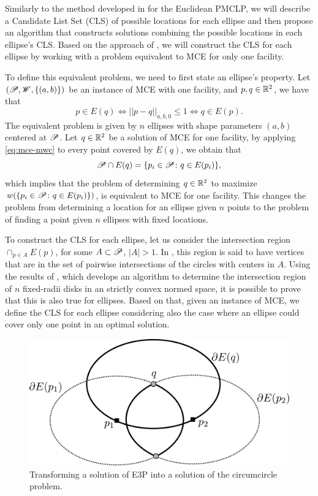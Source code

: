 Similarly to the method developed in \cite{church:1984} for the Euclidean PMCLP, we will describe a Candidate List Set (CLS) of possible locations for each ellipse and then propose an algorithm that constructs solutions combining the possible locations in each ellipse's CLS.
Based on the approach of \cite{chazelle:1986,cabello:2006}, we will construct the CLS for each ellipse by working with a problem equivalent to MCE for only one facility.

To define this equivalent problem, we need to first state an ellipse's property.
Let $(\mathscr{P}, \mathscr{W}, \{(a, b)\})$ be an instance of MCE with one facility, and  $p, q \in \mathbb{R}^2$, we have that
\begin{equation}\label{eq:mce-mwc}
p \in E(q) \Leftrightarrow ||p-q||_{a, b, 0} \le 1 \Leftrightarrow q \in E(p).
\end{equation}
The equivalent problem is given by $n$ ellipses with shape parameters $(a, b)$ centered at $\mathscr{P}$. Let $q\in\mathbb{R}^2$ be a solution of MCE for one facility, by applying \autoref{eq:mce-mwc} to every point covered by $E(q)$, we obtain that
\begin{equation}
\mathscr{P} \cap E(q) = \{p_i\in\mathscr{P} \colon q\in E(p_i)\},
\end{equation}
which implies that the problem of determining $q\in\mathbb{R}^2$ to maximize $w(\{p_i\in\mathscr{P} \colon q\in E(p_i)\})$, is equivalent to MCE for one facility. This changes the problem from determining a location for an ellipse given $n$ points to the problem of finding a point given $n$ ellipses with fixed locations.

To construct the CLS for each ellipse, let us consider the intersection region $\cap_{p\in A} E(p)$, for some $A\subset \mathscr{P}$, $|A|>1$. In \cite{church:1984}, this region 
is said to have vertices that are in the set of pairwise intersections of the circles with centers in $A$.
Using the results of \cite{bi}, which develops an algorithm to determine the intersection region of $n$ fixed-radii disks in an strictly convex normed space, it is possible to prove that this is also true for ellipses. Based on that, given an instance of MCE, we define the CLS for each ellipse considering also the case where an ellipse could cover only one point in an optimal solution.


\begin{figure}[!htb]

	\centering
	
	\includegraphics[scale=.3]{figures/MCE-vertices2}
	\caption{Transforming a solution of E3P into a solution of the circumcircle problem.}
	\label{fig:MCE-vertices}
\end{figure}


